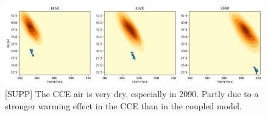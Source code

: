 \documentclass[11pt]{article}
\begin{document}
\begin{figure}[h]
\centering
\includegraphics[width=40pc]{figs/contours/TREFHTMX_RH2M_contours.png}
\caption{[SUPP] The CCE air is very dry, especially in 2090. Partly due to a stronger warming effect in the CCE than in the coupled model.}
\label{fig:precip}
\end{figure}



\nocite{*}

\end{document}
